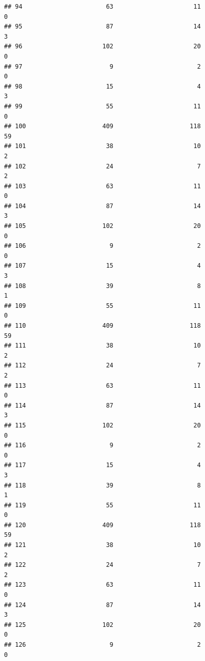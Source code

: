\documentclass[
]{article}
\begin{document}
\begin{verbatim}
## 94                       63                      11                        0
## 95                       87                      14                        3
## 96                      102                      20                        0
## 97                        9                       2                        0
## 98                       15                       4                        3
## 99                       55                      11                        0
## 100                     409                     118                       59
## 101                      38                      10                        2
## 102                      24                       7                        2
## 103                      63                      11                        0
## 104                      87                      14                        3
## 105                     102                      20                        0
## 106                       9                       2                        0
## 107                      15                       4                        3
## 108                      39                       8                        1
## 109                      55                      11                        0
## 110                     409                     118                       59
## 111                      38                      10                        2
## 112                      24                       7                        2
## 113                      63                      11                        0
## 114                      87                      14                        3
## 115                     102                      20                        0
## 116                       9                       2                        0
## 117                      15                       4                        3
## 118                      39                       8                        1
## 119                      55                      11                        0
## 120                     409                     118                       59
## 121                      38                      10                        2
## 122                      24                       7                        2
## 123                      63                      11                        0
## 124                      87                      14                        3
## 125                     102                      20                        0
## 126                       9                       2                        0

\end{verbatim}
\end{document}
